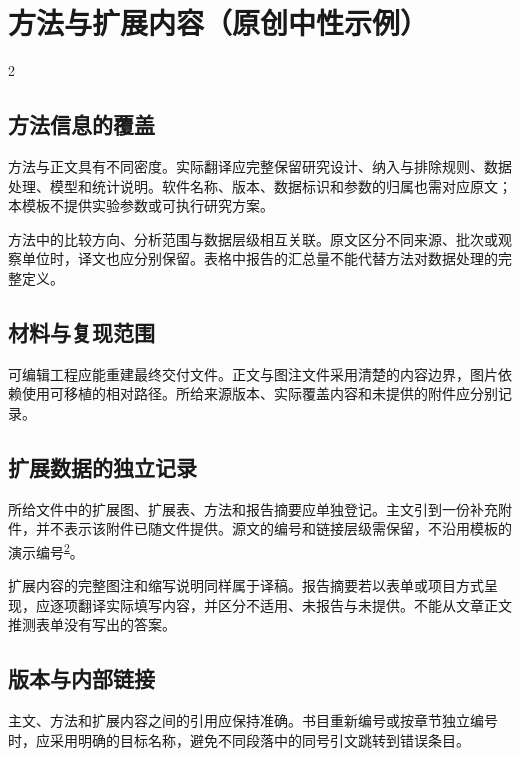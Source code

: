 \documentclass[UTF8,fontset=none,scheme=plain]{ctexart}
\renewcommand{\normalsize}{\fontsize{9.05bp}{12.1bp}\selectfont}
\newcommand{\NGCite}[1]{\textsuperscript{\hyperlink{ref:#1}{#1}}}
\newenvironment{NGColumns}{\begin{multicols}{2}\normalsize}{\end{multicols}}
\begin{document}
\section*{方法与扩展内容（原创中性示例）}
\begin{NGColumns}
\subsection*{方法信息的覆盖}
方法与正文具有不同密度。实际翻译应完整保留研究设计、纳入与排除规则、数据处理、模型和统计说明。软件名称、版本、数据标识和参数的归属也需对应原文；本模板不提供实验参数或可执行研究方案。
\par 方法中的比较方向、分析范围与数据层级相互关联。原文区分不同来源、批次或观察单位时，译文也应分别保留。表格中报告的汇总量不能代替方法对数据处理的完整定义。\par
\subsection*{材料与复现范围}
可编辑工程应能重建最终交付文件。正文与图注文件采用清楚的内容边界，图片依赖使用可移植的相对路径。所给来源版本、实际覆盖内容和未提供的附件应分别记录。
\subsection*{扩展数据的独立记录}
所给文件中的扩展图、扩展表、方法和报告摘要应单独登记。主文引到一份补充附件，并不表示该附件已随文件提供。源文的编号和链接层级需保留，不沿用模板的演示编号\NGCite{2}。
\par 扩展内容的完整图注和缩写说明同样属于译稿。报告摘要若以表单或项目方式呈现，应逐项翻译实际填写内容，并区分不适用、未报告与未提供。不能从文章正文推测表单没有写出的答案。\par
\subsection*{版本与内部链接}
主文、方法和扩展内容之间的引用应保持准确。书目重新编号或按章节独立编号时，应采用明确的目标名称，避免不同段落中的同号引文跳转到错误条目。
\end{NGColumns}
\end{document}
